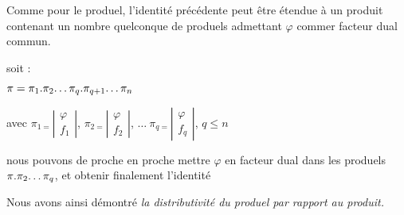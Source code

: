Comme pour le produel, l'identité précédente peut être étendue à
un produit contenant un nombre quelconque de produels admettant \og $\varphi$ \fg{}
commer \og facteur dual \fg{} commun.

soit :

\begin{center}
$\pi=\pi_{1}.\pi_{2}\text{\dots}\pi_{q}.\pi_{q+1}\text{\dots}\pi_{n}$
\end{center}

avec $\pi_{1=}\left|\begin{array}{c}
\varphi\\
f_{1}
\end{array}\right|$, $\pi_{2=}\left|\begin{array}{c}
\varphi\\
f_{2}
\end{array}\right|$, $\ldots\:\pi_{q=}\left|\begin{array}{c}
\varphi\\
f_{q}
\end{array}\right|$, $q\leq n$

nous pouvons de proche en proche mettre \og $\varphi$ \fg{} en
facteur dual dans les produels $\pi.\pi_{2}\text{\dots}\pi_{q}$,
et obtenir finalement l'identité \medskip

\begin{center}
\end{center}

Nous avons ainsi démontré \textsl{la distributivité du produel par
rapport au produit.} 

